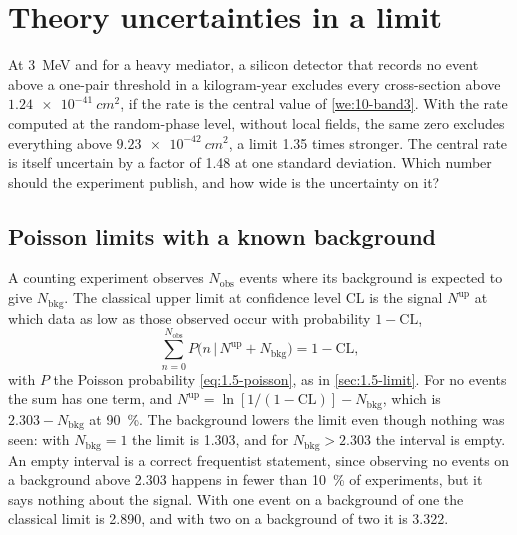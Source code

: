 \section{Theory uncertainties in a limit}\label{sec:21.4}

At \SI{3}{MeV} and for a heavy mediator, a silicon detector that records no event above a one-pair threshold in a kilogram-year excludes every cross-section above $\SI{1.24e-41}{cm^2}$, if the rate is the central value of \cref{we:10-band3}. With the rate computed at the random-phase level, without local fields, the same zero excludes everything above $\SI{9.23e-42}{cm^2}$, a limit 1.35 times stronger. The central rate is itself uncertain by a factor of 1.48 at one standard deviation. Which number should the experiment publish, and how wide is the uncertainty on it?

\subsection{Poisson limits with a known background}\label{sec:21.4-poisson}

A counting experiment observes $N_{\mathrm{obs}}$ events where its background is expected to give $N_{\mathrm{bkg}}$. The classical upper limit at confidence level $\mathrm{CL}$ is the signal $N^{\mathrm{up}}$ at which data as low as those observed occur with probability $1 - \mathrm{CL}$,
\begin{equation}
  \sum_{n=0}^{N_{\mathrm{obs}}}P\bigl(n\,\big|\,N^{\mathrm{up}} + N_{\mathrm{bkg}}\bigr) = 1 - \mathrm{CL} ,
  \label{eq:21.4-classical}
\end{equation}
with $P$ the Poisson probability \cref{eq:1.5-poisson}, as in \cref{sec:1.5-limit}. For no events the sum has one term, and $N^{\mathrm{up}} = \ln[1/(1 - \mathrm{CL})] - N_{\mathrm{bkg}}$, which is $2.303 - N_{\mathrm{bkg}}$ at \SI{90}{\percent}. The background lowers the limit even though nothing was seen: with $N_{\mathrm{bkg}} = 1$ the limit is 1.303, and for $N_{\mathrm{bkg}} > 2.303$ the interval is empty. An empty interval is a correct frequentist statement, since observing no events on a background above 2.303 happens in fewer than \SI{10}{\percent} of experiments, but it says nothing about the signal. With one event on a background of one the classical limit is 2.890, and with two on a background of two it is 3.322.

